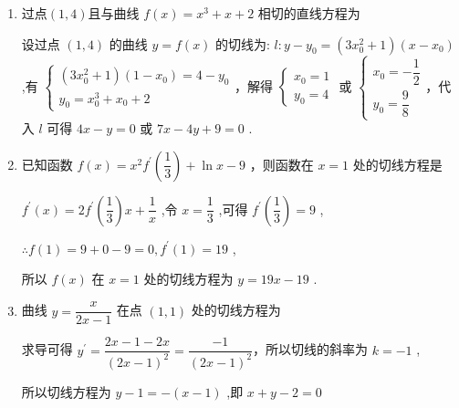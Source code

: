\begin{enumerate}
\begin{enumerate}
        \item 过点$(1,4)$且与曲线 $f\left( x\right)  = {x}^{3} + x + 2$ 相切的直线方程为
        \begin{jieda}
            设过点 $\left( {1,4}\right)$ 的曲线 $y = f\left( x\right)$ 的切线为: $l : y - {y}_{0} = \left( {3{x}_{0}^{2} + 1}\right) \left( {x - {x}_{0}}\right)$ ,有 $\left\{  \begin{matrix} \left( {3{x}_{0}^{2} + 1}\right) \left( {1 - {x}_{0}}\right)  = 4 - {y}_{0} \\  {y}_{0} = {x}_{0}^{3} + {x}_{0} + 2 \end{matrix}\right.$，解得 $\left\{  \begin{array}{l} {x}_{0} = 1 \\  {y}_{0} = 4 \end{array}\right.$ 或 $\left\{  \begin{array}{l} {x}_{0} =  - \dfrac{1}{2} \\  {y}_{0} = \dfrac{9}{8} \end{array}\right.$，代入 $l$ 可得 ${4x} - y = 0$ 或 ${7x} - {4y} + 9 = 0$ .
        \end{jieda}
        
        \item 已知函数 $f\left( x\right)  = {x}^{2}{f}^{\prime }\left( \dfrac{1}{3}\right)  + \ln x - 9$ ，则函数在 $x = 1$ 处的切线方程是
        \begin{jieda}
            ${f}^{\prime }\left( x\right)  = 2{f}^{\prime }\left( \dfrac{1}{3}\right) x + \dfrac{1}{x}$ ,令 $x = \dfrac{1}{3}$ ,可得 ${f}^{\prime }\left( \dfrac{1}{3}\right)  = 9$ ,
            
            $\therefore f\left( 1\right)  = 9 + 0 - 9 = 0,{f}^{\prime }\left( 1\right)  = {19}$ ,
            
            所以 $f\left( x\right)$ 在 $x = 1$ 处的切线方程为 $y = {19x} - {19}$ .
        \end{jieda}
        
        \item 曲线 $y = \dfrac{x}{{2x} - 1}$ 在点 $\left( {1,1}\right)$ 处的切线方程为
        \begin{jieda}
            求导可得 ${y}^{\prime } = \dfrac{{2x} - 1 - {2x}}{{\left( 2x - 1\right) }^{2}} = \dfrac{-1}{{\left( 2x - 1\right) }^{2}}$，所以切线的斜率为 $k =  - 1$ ,
            
            所以切线方程为 $y - 1 =  - \left( {x - 1}\right)$ ,即 $x + y - 2 = 0$
        \end{jieda}
        

\end{enumerate}
\end{enumerate}
